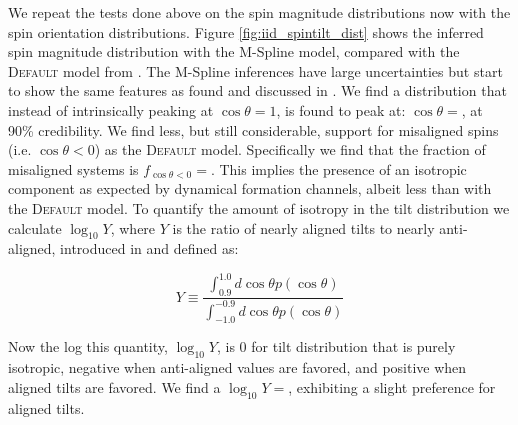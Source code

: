 We repeat the tests done above on the spin magnitude distributions now with the spin orientation distributions. Figure \ref{fig:iid_spintilt_dist} 
shows the inferred spin magnitude distribution with the M-Spline model, compared with the \textsc{Default} model from \citet{o3b_astro_dist}. 
The M-Spline inferences have large uncertainties but start to show the same features as found and discussed in \citet{spinitasyoulike}. 
We find a distribution that instead of intrinsically peaking at $\cos{\theta}=1$, is found to peak at: $\cos{\theta}=$\result{$\CIPlusMinus{\macros[MSplineIIDCompSpins][peakCosTilt]}$}, at 
90\% credibility. We find less, but still considerable, support for misaligned spins (i.e. $\cos{\theta}<0$) as the \textsc{Default} model. Specifically we 
find that the fraction of misaligned systems is $f_{\cos{\theta}<0}=$\result{$\CIPlusMinus{\macros[MSplineIIDCompSpins][negFrac]}$}. This implies 
the presence of an isotropic component as expected by dynamical formation channels, albeit less than with the \textsc{Default} model. To quantify the 
amount of isotropy in the tilt distribution we calculate $\log_{10}Y$, where $Y$ is the ratio of nearly aligned tilts to nearly anti-aligned, 
introduced in \citet{spinitasyoulike} and defined as:

\begin{equation}
    Y \equiv \frac{\int_{0.9}^{1.0} d\cos{\theta} p(\cos{\theta})}{\int_{-1.0}^{-0.9} d\cos{\theta} p(\cos{\theta})}
\end{equation}

\noindent Now the log this quantity, $\log_{10}Y$, is 0 for tilt distribution that is purely isotropic, negative when anti-aligned values are favored, 
and positive when aligned tilts are favored. We find a $\log_{10}Y=$, exhibiting a 
slight preference for aligned tilts.  

